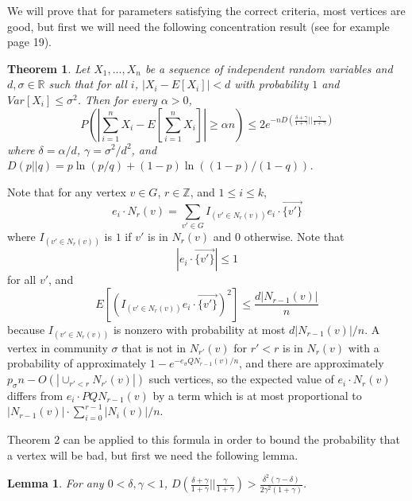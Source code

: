 \documentclass[11pt]{article}
\newcommand{\1}{\mathbb{1}}
\newtheorem{theorem}{Theorem}
\newtheorem{lemma}{Lemma}
\begin{document}
We will prove that for parameters satisfying the correct criteria, most vertices are good, but first we will need the following concentration result (see for example \cite{max-igal} page 19).
\begin{theorem}
Let $X_1,...,X_n$ be a sequence of independent random variables and $d,\sigma\in\mathbb{R}$ such that for all $i$, $|X_i-E[X_i]|<d$ with probability $1$ and $Var[X_i]\le\sigma^2$. Then for every $\alpha>0$, \[P\left(|\sum_{i=1}^n X_i-E\left[\sum_{i=1}^n X_i\right]|\ge \alpha n\right)\le 2e^{-nD(\frac{\delta+\gamma}{1+\gamma}||\frac{\gamma}{1+\gamma})}\] where $\delta=\alpha/d$, $\gamma=\sigma^2/d^2$, and $D(p||q)= p\ln(p/q)+(1-p)\ln((1-p)/(1-q))$.
\end{theorem}

Note that for any vertex $v\in G$, $r\in\mathbb{Z}$, and $1\le i\le k$, 
\[e_i\cdot N_r(v)=\sum_{v'\in G} I_{(v'\in N_r(v))} e_i\cdot \overrightarrow{\{v'\}}\] where $I_{(v'\in N_r(v))}$ is $1$ if $v'$ is in $N_r(v)$ and $0$ otherwise. Note that $$|e_i\cdot \overrightarrow{\{v'\}}|\le 1$$ for all $v'$, and $$E[ (I_{(v'\in N_r(v))} e_i\cdot \overrightarrow{\{v'\}})^2]\le \frac{d|N_{r-1}(v)|}{n}$$ because $I_{(v'\in N_r(v))}$ is nonzero with probability at most $d|N_{r-1}(v)|/n$. A vertex in community $\sigma$ that is not in $N_{r'}(v)$ for $r'<r$ is in $N_r(v)$ with a probability of approximately $1-e^{-e_\sigma QN_{r-1}(v)/n}$, and there are approximately $p_\sigma n-O(|\cup_{r'<r}N_{r'}(v)|)$ such vertices, so the expected value of $e_i\cdot N_r(v)$ differs from $e_i\cdot PQN_{r-1}(v)$ by a term which is at most proportional to $|N_{r-1}(v)|\cdot \sum_{i=0}^{r-1} |N_i(v)|/n$.



Theorem $2$ can be applied to this formula in order to bound the probability that a vertex will be bad, but first we need the following lemma.

\begin{lemma}
For any $0<\delta,\gamma<1$, $D(\frac{\delta+\gamma}{1+\gamma}||\frac{\gamma}{1+\gamma})>\frac{\delta^2(\gamma-\delta)}{2\gamma^2(1+\gamma)}$.
\end{lemma}
\end{document}
